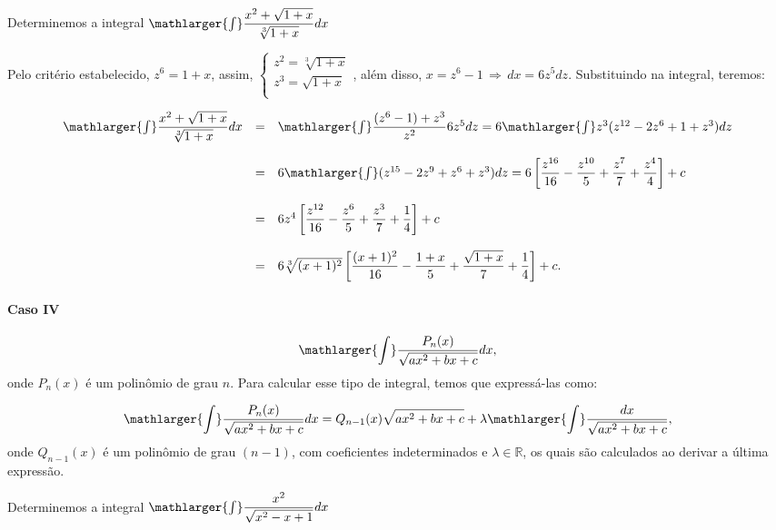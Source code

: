 \cleardoublepage\documentclass[../main.tex]{subfiles}
\begin{document}
\begin{ex}
Determinemos a integral \(\mathlarger{\int} \dfrac{x^2 +\sqrt{1+x}}{\sqrt[3]{1+x}}dx\)

\begin{solution}
Pelo critério estabelecido, \(z^6= 1+x\), assim, \( \left\{ \begin{array}{c} z^2=\sqrt[3]{1+x}\\ z^3=\sqrt{1+x}\\ \end{array} \right. \), além disso, \( x=z^6 -1\,\Rightarrow\,dx=6z^5 dz\). Substituindo na integral, teremos:

\[ \begin{array}{rcl} \mathlarger{\int} \dfrac{x^2 +\sqrt{1+x}}{\sqrt[3]{1+x}}dx &=& \mathlarger{\int} \dfrac{(z^6-1)+z^3}{z^2} 6z^5dz = 6\mathlarger{\int} z^3(z^{12}-2z^6+1+z^3)dz\\ \\ &=&6\mathlarger{\int} (z^{15}-2z^9+z^6+z^3)dz= 6\left[\dfrac{z^{16}}{16}-\dfrac{z^{10}}{5}+\dfrac{z^7}{7}+\dfrac{z^4}{4}\right]+c\\ \\ &=& 6z^4\left[\dfrac{z^{12}}{16}-\dfrac{z^6}{5}+\dfrac{z^3}{7}+\dfrac{1}{4}\right]+c\\ \\ &=& 6\sqrt[3]{(x+1)^2}\left[\dfrac{(x+1)^2}{16}-\dfrac{1+x}{5}+\dfrac{\sqrt{1+x}}{7}+\dfrac{1}{4}\right]+c. \end{array} \]
\end{solution}
\end{ex}

\paragraph*{Caso IV}
\[ \mathlarger{\int} \dfrac{P_n(x)}{\sqrt{ax^2+bx+c}}dx, \]
onde \(P_n(x)\) é um polinômio de grau \(n\). Para calcular esse tipo de integral, temos que expressá-las como:

\[ \mathlarger{\int} \dfrac{P_n(x)}{\sqrt{ax^2+bx+c}}dx = Q_{n-1}(x)\sqrt{ax^2+bx+c} + \lambda \mathlarger{\int} \dfrac{dx}{\sqrt{ax^2+bx+c}}, \]
onde \(Q_{n-1}(x)\) é um polinômio de grau \((n-1)\), com coeficientes indeterminados e \(\lambda \in \mathbb{R}\), os quais são calculados ao derivar a última expressão.

\begin{ex}
Determinemos a integral \(\mathlarger{\int} \dfrac{x^2}{\sqrt{x^2-x+1}}dx\)
\end{ex}
\end{document}
